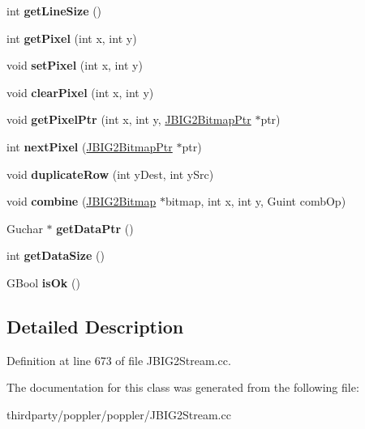 \begin{DoxyCompactItemize}
int {\bfseries get\+Line\+Size} ()
\item 
\mbox{\label{class_j_b_i_g2_bitmap_a03e34d16c2e79eff95cd90790cba3953}} 
int {\bfseries get\+Pixel} (int x, int y)
\item 
\mbox{\label{class_j_b_i_g2_bitmap_adc8520c21b066ed95bdbc5a01aefd40c}} 
void {\bfseries set\+Pixel} (int x, int y)
\item 
\mbox{\label{class_j_b_i_g2_bitmap_a580f8d1532c531782b64254a70f8fa05}} 
void {\bfseries clear\+Pixel} (int x, int y)
\item 
\mbox{\label{class_j_b_i_g2_bitmap_a04b1f80fd8f72b26da09d67a170f19d7}} 
void {\bfseries get\+Pixel\+Ptr} (int x, int y, \hyperlink{struct_j_b_i_g2_bitmap_ptr}{J\+B\+I\+G2\+Bitmap\+Ptr} $\ast$ptr)
\item 
\mbox{\label{class_j_b_i_g2_bitmap_a675be8126e6a4f56fa7701a0a6d07949}} 
int {\bfseries next\+Pixel} (\hyperlink{struct_j_b_i_g2_bitmap_ptr}{J\+B\+I\+G2\+Bitmap\+Ptr} $\ast$ptr)
\item 
\mbox{\label{class_j_b_i_g2_bitmap_a2ac3e84b78c6d2353d07e34a8aaf1e5f}} 
void {\bfseries duplicate\+Row} (int y\+Dest, int y\+Src)
\item 
\mbox{\label{class_j_b_i_g2_bitmap_a7188777b3263ff34985db584d4565179}} 
void {\bfseries combine} (\hyperlink{class_j_b_i_g2_bitmap}{J\+B\+I\+G2\+Bitmap} $\ast$bitmap, int x, int y, Guint comb\+Op)
\item 
\mbox{\label{class_j_b_i_g2_bitmap_a07ba4cbdc195ef4aaf68f437fb561693}} 
Guchar $\ast$ {\bfseries get\+Data\+Ptr} ()
\item 
\mbox{\label{class_j_b_i_g2_bitmap_a5e123678417b94d2ffc911ae39b062e0}} 
int {\bfseries get\+Data\+Size} ()
\item 
\mbox{\label{class_j_b_i_g2_bitmap_ac0546f97bb992025cb853e43eaf4911f}} 
G\+Bool {\bfseries is\+Ok} ()
\end{DoxyCompactItemize}


\subsection{Detailed Description}


Definition at line 673 of file J\+B\+I\+G2\+Stream.\+cc.



The documentation for this class was generated from the following file\+:\begin{DoxyCompactItemize}
\item 
thirdparty/poppler/poppler/J\+B\+I\+G2\+Stream.\+cc\end{DoxyCompactItemize}
